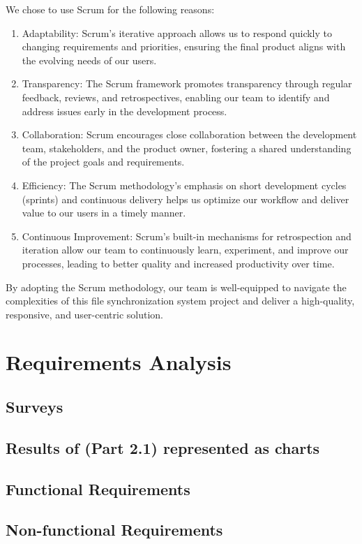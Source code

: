 \documentclass{article}
\begin{document}
        We chose to use Scrum for the following reasons:
        \begin{enumerate}
          \item Adaptability: Scrum's iterative approach allows us to respond quickly to changing requirements and priorities, ensuring the final product aligns with the evolving needs of our users.
          \item Transparency: The Scrum framework promotes transparency through regular feedback, reviews, and retrospectives, enabling our team to identify and address issues early in the development process.
          \item Collaboration: Scrum encourages close collaboration between the development team, stakeholders, and the product owner, fostering a shared understanding of the project goals and requirements.
          \item Efficiency: The Scrum methodology's emphasis on short development cycles (sprints) and continuous delivery helps us optimize our workflow and deliver value to our users in a timely manner.
          \item Continuous Improvement: Scrum's built-in mechanisms for retrospection and iteration allow our team to continuously learn, experiment, and improve our processes, leading to better quality and increased productivity over time.
        \end{enumerate}
       By adopting the Scrum methodology, our team is well-equipped to navigate the complexities of this file synchronization system project and deliver a high-quality, responsive, and user-centric solution.
	\section{Requirements Analysis}
		\subsection{Surveys}
		
		\subsection{Results of (Part 2.1) represented as charts}
		
		\subsection{Functional Requirements}
		
		\subsection{Non-functional Requirements}
		
\end{document}
